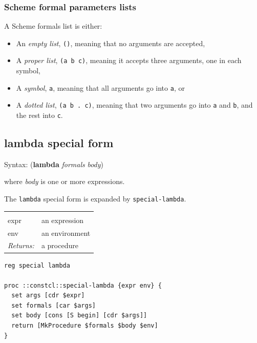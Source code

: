 \documentclass[a5paper,draft]{memoir}
\begin{document}
\begin{pulledtext}

\subsubsection{Scheme formal parameters lists}
\label{scheme-formal-parameters-lists}

A Scheme formals list is either:

\begin{itemize}
\item An \emph{empty list}, \texttt{()}, meaning that no arguments are accepted,
\item A \emph{proper list}, \texttt{(a b c)}, meaning it accepts three arguments, one in each symbol,
\item A \emph{symbol}, \texttt{a}, meaning that all arguments go into \texttt{a}, or
\item A \emph{dotted list}, \texttt{(a b . c)}, meaning that two arguments go into \texttt{a} and \texttt{b}, and the rest into \texttt{c}.
\end{itemize}
\end{pulledtext}

\subsection{lambda special form}
\label{lambda-special-form}

Syntax: (\textbf{lambda} \emph{formals} \emph{body})

where \emph{body} is one or more expressions.

The \texttt{lambda} special form is expanded by \texttt{special-lambda}.

\noindent\begin{tabular}{ |p{1.9cm} p{6.5cm}| }
\hline
\rowcolor[HTML]{CCCCCC} \multicolumn{2}{|l|}{\textbf{special-lambda (internal)}} \\
expr & an expression \\
env & an environment \\
\textit{Returns:} & a procedure \\
\hline
\end{tabular}

\begin{lstlisting}
reg special lambda

proc ::constcl::special-lambda {expr env} {
  set args [cdr $expr]
  set formals [car $args]
  set body [cons [S begin] [cdr $args]]
  return [MkProcedure $formals $body $env]
}
\end{lstlisting}
\end{document}
